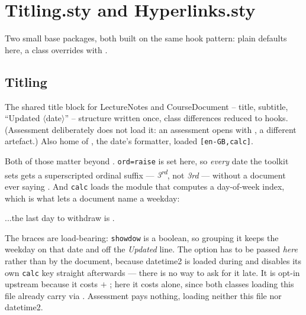 \section{Titling.sty and Hyperlinks.sty}\label{sec:ref-titling}

Two small base packages, both built on the same hook pattern: plain
defaults here, a class overrides with .

\subsection*{Titling}

The shared title block for LectureNotes and CourseDocument -- title,
subtitle, ``Updated $\langle$date$\rangle$'' -- structure written once,
class differences reduced to hooks. (Assessment deliberately does not load
it: an assessment opens with , a different artefact.)
Also home of , the date's formatter, loaded
\texttt{[en-GB,calc]}.

Both of those matter beyond . \texttt{ord=raise} is set here, so
\emph{every} date the toolkit sets gets a superscripted ordinal suffix ---
\emph{3\textsuperscript{rd}}, not \emph{3rd} --- without a document ever
saying . And \texttt{calc} loads the module that
computes a day-of-week index, which is what lets a document name a weekday:

\begin{manexsource}
...the last day to withdraw is
  {}.   %
\end{manexsource}

The braces are load-bearing: \texttt{showdow} is a boolean, so grouping it
keeps the weekday on that date and off the \emph{Updated} line. The option
has to be passed \emph{here} rather than by the document, because datetime2
is loaded during  and disables its own \texttt{calc} key
straight afterwards --- there is no way to ask for it late. It is opt-in
upstream because it costs  $+$ ; here it
costs  alone, since both classes loading this file already
carry  via . Assessment pays nothing, loading
neither this file nor datetime2.

